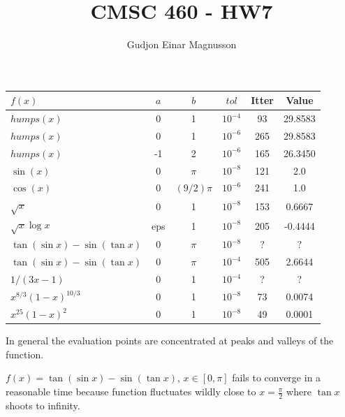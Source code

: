 \documentclass[12pt]{article}
\begin{document}
\title{CMSC 460 - HW7}
\author{Gudjon Einar Magnusson}

\maketitle

\section{}

\begin{center}
 \begin{tabular}{l c c c c c} 
 $f(x)$ & $a$ & $b$ & $tol$ & Itter & Value \\
 \hline

 $humps(x)$ & 0 & 1 & $10^{-4}$ & 93 & 29.8583 \\ 
 $humps(x)$ & 0 & 1 & $10^{-6}$ & 265 & 29.8583 \\
 $humps(x)$ & -1 & 2 & $10^{-6}$ & 165 & 26.3450 \\
 $\sin(x)$ & 0 & $\pi$ & $10^{-8}$ & 121 & 2.0 \\
 $\cos(x)$ & 0 & $(9/2)\pi$ & $10^{-6}$ & 241 & 1.0 \\
 $\sqrt{x}$ & 0 & 1 & $10^{-8}$ & 153 & 0.6667 \\
 $\sqrt{x} \log x$ & eps & 1 & $10^{-8}$ & 205 & -0.4444 \\

 $\tan(\sin x) - \sin(\tan x)$ & 0 & $\pi$ & $10^{-8}$ & ? & ? \\
 $\tan(\sin x) - \sin(\tan x)$ & 0 & $\pi$ & $10^{-4}$ & 505 & 2.6644 \\

 $1/(3x-1)$ & 0 & 1 & $10^{-4}$ & ? & ? \\ 

 $x^{8/3}(1-x)^{10/3}$ & 0 & 1 & $10^{-8}$ & 73 & 0.0074 \\ 
 $x^{25}(1-x)^2$ & 0 & 1 & $10^{-8}$ & 49 & 0.0001 \\ 

\end{tabular}
\end{center}

In general the evaluation points are concentrated at peaks and valleys of the function.

$f(x) = \tan(\sin x) - \sin(\tan x)$, $x \in [0, \pi]$ fails to converge in a reasonable time because function fluctuates wildly close to $x=\frac{\pi}{2}$ where $\tan x$ shoots to infinity.
\end{document}
